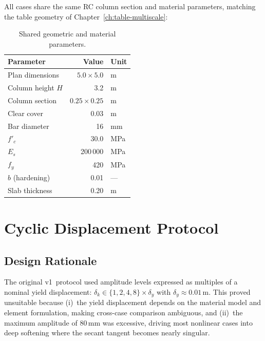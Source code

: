 All cases share the same RC column section and material parameters,
matching the table geometry of Chapter~\ref{ch:table-multiscale}:

\begin{table}[htbp]
\centering
\caption{Shared geometric and material parameters.}
\label{tab:cyclic-params}
\begin{tabular}{lrl}
\toprule
\textbf{Parameter}    & \textbf{Value} & \textbf{Unit} \\
\midrule
Plan dimensions       & $5.0 \times 5.0$ & m \\
Column height $H$     & 3.2        & m \\
Column section        & $0.25 \times 0.25$ & m \\
Clear cover           & 0.03       & m \\
Bar diameter          & 16         & mm \\
$f'_c$                & 30.0       & MPa \\
$E_s$                 & 200\,000   & MPa \\
$f_y$                 & 420        & MPa \\
$b$ (hardening)       & 0.01       & --- \\
Slab thickness        & 0.20       & m \\
\bottomrule
\end{tabular}
\end{table}


\section{Cyclic Displacement Protocol}
\label{sec:cyclic-protocol}

\subsection{Design Rationale}

The original v1~protocol used amplitude levels expressed as multiples
of a nominal yield displacement: $\delta_k \in
\{1,2,4,8\}\times\delta_y$ with $\delta_y \approx 0.01$\,m.  This
proved unsuitable because (i)~the yield displacement depends on the
material model and element formulation, making cross-case comparison
ambiguous, and (ii)~the maximum amplitude of $80$\,mm was excessive,
driving most nonlinear cases into deep softening where the secant
tangent becomes nearly singular.

